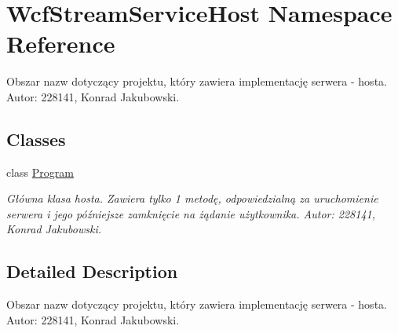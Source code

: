 \hypertarget{namespace_wcf_stream_service_host}{}\section{Wcf\+Stream\+Service\+Host Namespace Reference}
\label{namespace_wcf_stream_service_host}


Obszar nazw dotyczący projektu, który zawiera implementację serwera -\/ hosta. Autor\+: 228141, Konrad Jakubowski.  


\subsection*{Classes}
\begin{DoxyCompactItemize}
\item 
class \hyperlink{class_wcf_stream_service_host_1_1_program}{Program}
\begin{DoxyCompactList}\small\item\em Główna klasa hosta. Zawiera tylko 1 metodę, odpowiedzialną za uruchomienie serwera i jego późniejsze zamknięcie na żądanie użytkownika. Autor\+: 228141, Konrad Jakubowski. \end{DoxyCompactList}\end{DoxyCompactItemize}


\subsection{Detailed Description}
Obszar nazw dotyczący projektu, który zawiera implementację serwera -\/ hosta. Autor\+: 228141, Konrad Jakubowski. 

